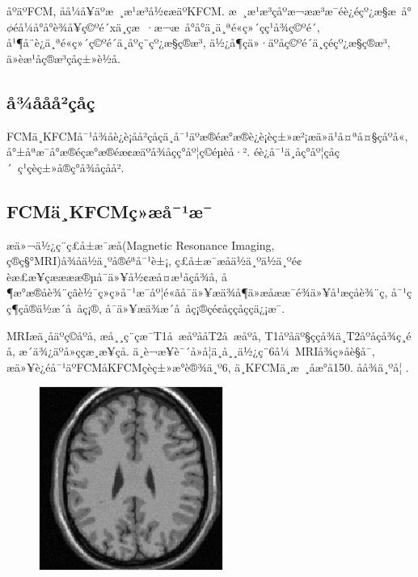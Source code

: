 \documentclass[lang=cn,11pt]{elegantpaper}
\begin{document}
åºäºFCM, åå¼å¥äºæ ¸æ¹æ³å½¢æäºKFCM. æ ¸æ¹æ³çåºæ¬ææ³æ¯éè¿éçº¿æ§æ å°$\phi$éå¼å°å°è¾å¥ç©ºé´xä¸­çæ ·æ¬æ å°å°ä¸ä¸ªé«ç»´çç¹å¾ç©ºé´, å¹¶å¨è¿ä¸ªé«ç»´ç©ºé´ä¸­åºç¨çº¿æ§ç®æ³, ä½¿å¶ç­ä»·äºåç©ºé´ä¸­çéçº¿æ§ç®æ³, ä»èæ¹åç®æ³çåç±»è½å. 
\subsection{å¾ååå²çåç}
FCMä¸KFCMå¯¹å¾åè¿è¡åå²çåçä¸å¯¹äºæ®éæ°æ®è¿è¡èç±»æ²¡æä»ä¹å¤ªå¤§çåºå«, å°±åªæ¯å°æ®éçæ°æ®éæ¢æäºå¾åçç°åº¦ç©éµèå·². éè¿å¯¹ä¸åç°åº¦çåç´ ç¹çèç±»å®ç°å¾åçåå². 
\subsection{FCMä¸KFCMç»æå¯¹æ¯}
æä»¬ä½¿ç¨ç£å±æ¯æå(Magnetic Resonance Imaging, ç®ç§°MRI)å¾åä½ä¸ºå®éªå¯¹è±¡, ç£å±æ¯æåä½ä¸ºä½ä¸ºé¢èæ£æ¥çææææ®µå¯ä»¥å½¢æå¤æ¹åçå¾å, å¶æ°æ®åè¾¨çãè½¯ç»ç»å¯¹æ¯åº¦é«ãå¯ä»¥æä¾å¶ä»æåææ¯é¾ä»¥å¹æçåè¾¨ç, å¯¹çç¶çå®ä½æ´å åç¡®, å¯ä»¥æä¾æ´å åç¡®çé¢åççåççä¿¡æ¯. 

MRIæä¸åäºç©åºå, æå¸¸ç¨çæ¯T1å æåºååT2å æåºå, T1åºåäº§ççå¾ä¸T2åºåçå¾ç¸éå, æ´ä¾¿äºå»ççæ¸æ¥çå. ä¸è¬æ¥è¯´å»å­¦ä¸å¸¸ä½¿ç¨6å¼ MRIå¾ç»åè§å¯, æä»¥è¿éå¯¹äºFCMåKFCMçèç±»æ°è®¾ä¸º6, ä¸KFCMä¸­æ ¸åæ°å150. åå¾ä¸ºå¦ .
\begin{figure}[ht]
    \centering
    \includegraphics[width=.35\textwidth]{Brain/Origin}
    \caption{\label{fig:BO}}
\end{figure}
\end{document}
